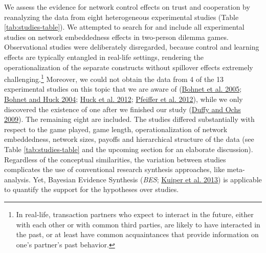 \documentclass[
  11pt,
]{article}
\begin{document}
We assess the evidence for network control effects on trust and cooperation by reanalyzing the data from eight heterogeneous experimental studies (Table \ref{tab:studies-table}).
We attempted to search for and include all experimental studies on network embeddedness effects in two-person dilemma games.
Observational studies were deliberately disregarded, because control and learning effects are typically entangled in real-life settings, rendering the operationalization of the separate constructs without spillover effects extremely challenging.\footnote{In real-life, transaction partners who expect to interact in the future, either with each other or with common third parties, are likely to have interacted in the past, or at least have common acquaintances that provide information on one's partner's past behavior.}
Moreover, we could not obtain the data from 4 of the 13 experimental studies on this topic that we are aware of (\protect\hyperlink{ref-bohnet_learning_2005}{Bohnet et al. 2005}; \protect\hyperlink{ref-bohnet_huck_2004}{Bohnet and Huck 2004}; \protect\hyperlink{ref-huck_competition_2012}{Huck et al. 2012}; \protect\hyperlink{ref-pfeiffer_etal_value_2012}{Pfeiffer et al. 2012}), while we only discovered the existence of one after we finished our study (\protect\hyperlink{ref-duffy_cooperative_2009}{Duffy and Ochs 2009}).
The remaining eight are included.
The studies differed substantially with respect to the game played, game length, operationalization of network embeddedness, network sizes, payoffs and hierarchical structure of the data (see Table \ref{tab:studies-table} and the upcoming section for an elaborate discussion).
Regardless of the conceptual similarities, the variation between studies complicates the use of conventional research synthesis approaches, like meta-analysis.
Yet, Bayesian Evidence Synthesis (\emph{BES}; \protect\hyperlink{ref-kuiper_combining_2013}{Kuiper et al. 2013}) is applicable to quantify the support for the hypotheses over studies.
\end{document}
